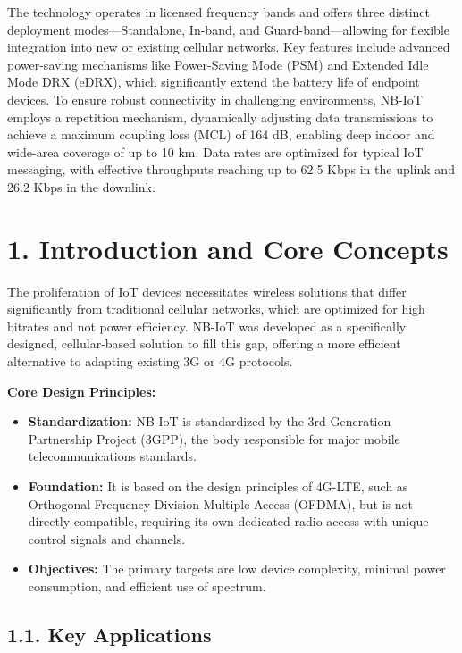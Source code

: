 \documentclass[a4paper, 12pt]{book} %
\begin{document}
The technology operates in licensed frequency bands and offers three
distinct deployment modes---Standalone, In-band, and
Guard-band---allowing for flexible integration into new or existing
cellular networks. Key features include advanced power-saving mechanisms
like Power-Saving Mode (PSM) and Extended Idle Mode DRX (eDRX), which
significantly extend the battery life of endpoint devices. To ensure
robust connectivity in challenging environments, NB-IoT employs a
repetition mechanism, dynamically adjusting data transmissions to
achieve a maximum coupling loss (MCL) of 164 dB, enabling deep indoor
and wide-area coverage of up to 10 km. Data rates are optimized for
typical IoT messaging, with effective throughputs reaching up to 62.5
Kbps in the uplink and 26.2 Kbps in the downlink.

\section{1. Introduction and Core
Concepts}\label{introduction-and-core-concepts}

The proliferation of IoT devices necessitates wireless solutions that
differ significantly from traditional cellular networks, which are
optimized for high bitrates and not power efficiency. NB-IoT was
developed as a specifically designed, cellular-based solution to fill
this gap, offering a more efficient alternative to adapting existing 3G
or 4G protocols.

\textbf{Core Design Principles:}

\begin{itemize}
\tightlist
\item
  \textbf{Standardization:} NB-IoT is standardized by the 3rd Generation
  Partnership Project (3GPP), the body responsible for major mobile
  telecommunications standards.
\item
  \textbf{Foundation:} It is based on the design principles of 4G-LTE,
  such as Orthogonal Frequency Division Multiple Access (OFDMA), but is
  not directly compatible, requiring its own dedicated radio access with
  unique control signals and channels.
\item
  \textbf{Objectives:} The primary targets are low device complexity,
  minimal power consumption, and efficient use of spectrum.
\end{itemize}

\subsection{1.1. Key Applications}\label{key-applications}
\end{document}
